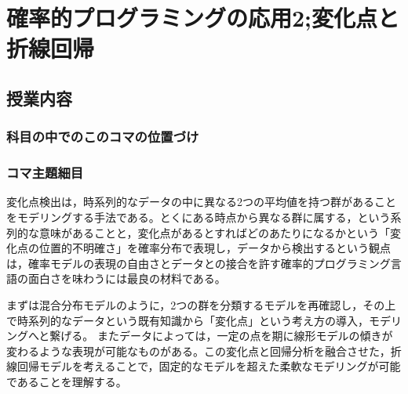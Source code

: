 \section{確率的プログラミングの応用2;変化点と折線回帰}
\subsection{授業内容}
\subsubsection{科目の中でのこのコマの位置づけ}
\subsubsection{コマ主題細目}
変化点検出は，時系列的なデータの中に異なる2つの平均値を持つ群があることをモデリングする手法である。とくにある時点から異なる群に属する，という系列的な意味があることと，変化点があるとすればどのあたりになるかという「変化点の位置的不明確さ」を確率分布で表現し，データから検出するという観点は，確率モデルの表現の自由さとデータとの接合を許す確率的プログラミング言語の面白さを味わうには最良の材料である。

まずは混合分布モデルのように，2つの群を分類するモデルを再確認し，その上で時系列的なデータという既有知識から「変化点」という考え方の導入，モデリングへと繋げる。
またデータによっては，一定の点を期に線形モデルの傾きが変わるような表現が可能なものがある。この変化点と回帰分析を融合させた，折線回帰モデルを考えることで，固定的なモデルを超えた柔軟なモデリングが可能であることを理解する。

